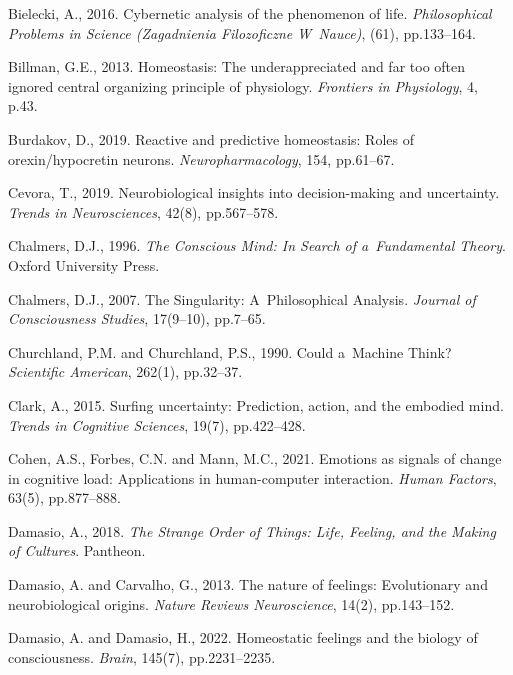 Bielecki, A., 2016. Cybernetic analysis of the phenomenon of life. \textit{Philosophical Problems in Science (Zagadnienia Filozoficzne W~Nauce)}, (61), pp.133–164.



Billman, G.E., 2013. Homeostasis: The underappreciated and far too often ignored central organizing principle of physiology. \textit{Frontiers in Physiology}, 4, p.43.



Burdakov, D., 2019. Reactive and predictive homeostasis: Roles of orexin/hypocretin neurons. \textit{Neuropharmacology}, 154, pp.61–67.



Cevora, T., 2019. Neurobiological insights into decision-making and uncertainty. \textit{Trends in Neurosciences}, 42(8), pp.567–578.



Chalmers, D.J., 1996. \textit{The Conscious Mind: In Search of a~Fundamental Theory}. Oxford University Press.



Chalmers, D.J., 2007. The Singularity: A~Philosophical Analysis. \textit{Journal of Consciousness Studies}, 17(9–10), pp.7–65.



Churchland, P.M. and Churchland, P.S., 1990. Could a~Machine Think? \textit{Scientific American}, 262(1), pp.32–37.



Clark, A., 2015. Surfing uncertainty: Prediction, action, and the embodied mind. \textit{Trends in Cognitive Sciences}, 19(7), pp.422–428.



Cohen, A.S., Forbes, C.N. and Mann, M.C., 2021. Emotions as signals of change in cognitive load: Applications in human-computer interaction. \textit{Human Factors}, 63(5), pp.877–888.



Damasio, A., 2018. \textit{The Strange Order of Things: Life, Feeling, and the Making of Cultures}. Pantheon.



Damasio, A. and Carvalho, G., 2013. The nature of feelings: Evolutionary and neurobiological origins. \textit{Nature Reviews Neuroscience}, 14(2), pp.143–152.



Damasio, A. and Damasio, H., 2022. Homeostatic feelings and the biology of consciousness. \textit{Brain}, 145(7), pp.2231–2235.



